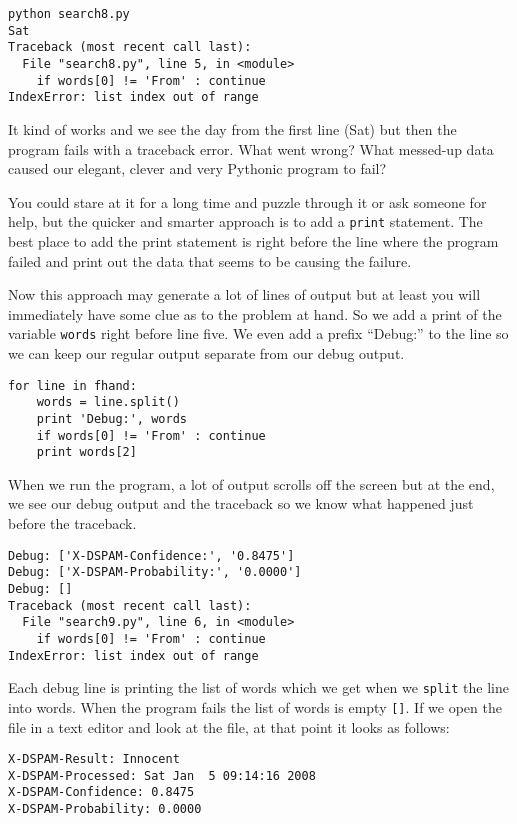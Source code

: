 \begin{enumerate}
\beforeverb
\begin{verbatim}
python search8.py 
Sat
Traceback (most recent call last):
  File "search8.py", line 5, in <module>
    if words[0] != 'From' : continue
IndexError: list index out of range
\end{verbatim}
\afterverb
%
It kind of works and we see the day from the first line
(Sat) but then the program fails with a traceback error.
What went wrong?  What messed-up data caused our elegant, 
clever and very Pythonic program to fail?

You could stare at it for a long time and puzzle through
it or ask someone for help, but the quicker and smarter
approach is to add a {\tt print} statement.  The best place
to add the print statement is right before the line where
the program failed and print out the data that seems to be causing
the failure.

Now this approach may generate a lot of lines of output but at 
least you will immediately have some clue as to the 
problem at hand.  So we add a print of the variable
{\tt words} right before line five.  We even 
add a prefix ``Debug:'' to the line so we can keep
our regular output separate from our debug output.

\beforeverb
\begin{verbatim}
for line in fhand:
    words = line.split()
    print 'Debug:', words
    if words[0] != 'From' : continue
    print words[2]
\end{verbatim}
\afterverb
%
When we run the program, a lot of output scrolls off the screen
but at the end, we see our debug output and the traceback so 
we know what happened just before the traceback.

\beforeverb
\begin{verbatim}
Debug: ['X-DSPAM-Confidence:', '0.8475']
Debug: ['X-DSPAM-Probability:', '0.0000']
Debug: []
Traceback (most recent call last):
  File "search9.py", line 6, in <module>
    if words[0] != 'From' : continue
IndexError: list index out of range
\end{verbatim}
\afterverb
%
Each debug line is printing the list of words which we get
when we {\tt split} the line into words.  When the program fails
the list of words is empty \verb"[]".  If we open the file in a text editor
and look at the file, at that point it looks as follows:

\beforeverb
\begin{verbatim}
X-DSPAM-Result: Innocent
X-DSPAM-Processed: Sat Jan  5 09:14:16 2008
X-DSPAM-Confidence: 0.8475
X-DSPAM-Probability: 0.0000


\end{verbatim}
\end{enumerate}

